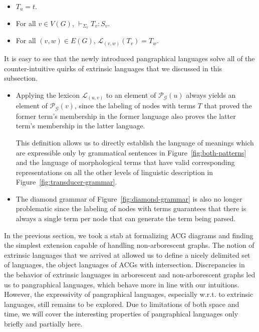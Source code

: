 \begin{itemize}
  \item $T_u = t$.
  \item For all $v \in V(G)$, $\vdash_{\Sigma_v} T_v : S_v$.
  \item For all $(v,w) \in E(G)$, $\mathcal{L}_{(v,w)}(T_v) = T_w$.
\end{itemize}

It is easy to see that the newly introduced pangraphical languages solve
all of the counter-intuitive quirks of extrinsic languages that we
discussed in this subsection.

\begin{itemize}
\item Applying the lexicon $\mathcal{L}_{(u,v)}$ to an element of
  $\mathcal{P}_{\mathcal{G}}(u)$ always yields an element of
  $\mathcal{P}_{\mathcal{G}}(v)$, since the labeling of nodes with terms
  $T$ that proved the former term's membership in the former language
  also proves the latter term's membership in the latter language.

  This definition allows us to directly establish the language of
  meanings which are expressible only by grammatical sentences in
  Figure~\ref{fig:both-patterns} and the language of morphological terms
  that have valid corresponding representations on all the other levels
  of linguistic description in Figure~\ref{fig:transducer-grammar}.
\item The diamond grammar of Figure~\ref{fig:diamond-grammar} is also no
  longer problematic since the labeling of nodes with terms guarantees
  that there is always a single term per node that can generate the term
  being parsed.
\end{itemize}

In the previous section, we took a stab at formalizing ACG diagrams and
finding the simplest extension capable of handling non-arborescent
graphs. The notion of extrinsic languages that we arrived at allowed us
to define a nicely delimited set of languages, the object languages of
ACGs with intersection. Discrepancies in the behavior of extrinsic
languages in arborescent and non-arborescent graphs led us to
pangraphical languages, which behave more in line with our
intuitions. However, the expressivity of pangraphical languages,
especially w.r.t. to extrinsic languages, still remains to be
explored. Due to limitations of both space and time, we will cover the
interesting properties of pangraphical languages only briefly and
partially here.

